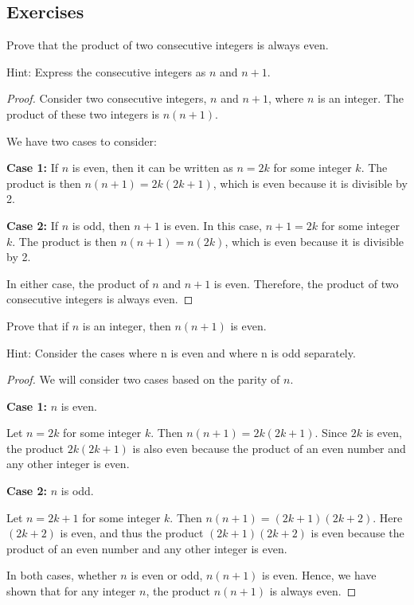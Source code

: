\documentclass[
	12pt, %
	fleqn, %
	a4paper, %
]{LegrandOrangeBook}
\begin{document}
\subsection{Exercises}
\begin{exercise}
			Prove that the product of two consecutive integers is always even.
\end{exercise}
		Hint: Express the consecutive integers as \( n \) and \( n + 1 \).
\begin{proof}
Consider two consecutive integers, \( n \) and \( n + 1 \), where \( n \) is an integer. The product of these two integers is \( n(n + 1) \).

We have two cases to consider:

\textbf{Case 1:} If \( n \) is even, then it can be written as \( n = 2k \) for some integer \( k \). The product is then \( n(n + 1) = 2k(2k + 1) \), which is even because it is divisible by 2.

\textbf{Case 2:} If \( n \) is odd, then \( n + 1 \) is even. In this case, \( n + 1 = 2k \) for some integer \( k \). The product is then \( n(n + 1) = n(2k) \), which is even because it is divisible by 2.

In either case, the product of \( n \) and \( n + 1 \) is even. Therefore, the product of two consecutive integers is always even.
\end{proof}
\begin{exercise}
	Prove that if \( n \) is an integer, then \( n(n+1) \) is even.
\end{exercise}
Hint: Consider the cases where n is even and where n is odd separately.
\begin{proof}
We will consider two cases based on the parity of \( n \).

\textbf{Case 1:} \( n \) is even.

Let \( n = 2k \) for some integer \( k \). Then \( n(n+1) = 2k(2k+1) \). Since \( 2k \) is even, the product \( 2k(2k+1) \) is also even because the product of an even number and any other integer is even.

\textbf{Case 2:} \( n \) is odd.

Let \( n = 2k+1 \) for some integer \( k \). Then \( n(n+1) = (2k+1)(2k+2) \). Here \( (2k+2) \) is even, and thus the product \( (2k+1)(2k+2) \) is even because the product of an even number and any other integer is even.

In both cases, whether \( n \) is even or odd, \( n(n+1) \) is even. Hence, we have shown that for any integer \( n \), the product \( n(n+1) \) is always even.
\end{proof}
\end{document}
